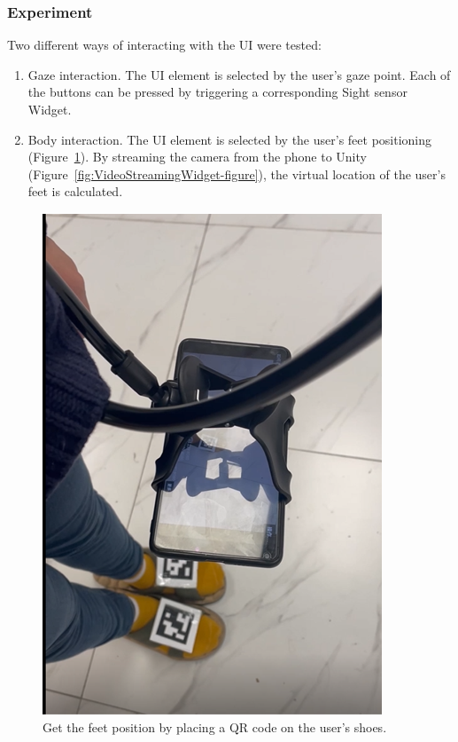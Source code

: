 \subsubsection{Experiment}

Two different ways of interacting with the UI were tested:
\begin{enumerate}
    \item Gaze interaction. The UI element is selected by the user's gaze point. Each of the buttons can be pressed by triggering a corresponding Sight sensor Widget.
    \item Body interaction. The UI element is selected by the user's feet positioning (Figure~\ref{fig:Project11_1-figure}). By streaming the camera from the phone to Unity (Figure~\ref{fig:VideoStreamingWidget-figure}), the virtual location of the user's feet is calculated.
\end{enumerate}


\begin{figure}
  \centering
  \includegraphics[width=0.6\linewidth]{figures/Project_11_1.png}
  \caption{Get the feet position by placing a QR code on the user's shoes.}
  \label{fig:Project11_1-figure}
\end{figure}


